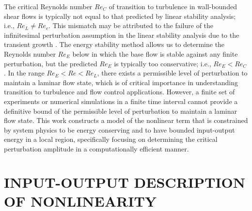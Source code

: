 \documentclass[10pt, a4paper]{article}
\begin{document}
The critical Reynolds number $Re_C$ of transition to turbulence in wall-bounded shear flows is typically not equal to that predicted by linear stability analysis; i.e., $Re_L\neq Re_c$. This mismatch may be attributed to the failure of the infinitesimal perturbation assumption in the linear stability analysis due to the transient growth \citep{henningson1994role}. The energy stability method \citep{joseph2013stability} allows us to determine the Reynolds number $Re_E$ below in which the base flow is stable against any finite perturbation, but the predicted $Re_E$ is typically too conservative; i.e., $Re_E<Re_C$. In the range $Re_E<Re<Re_L$, there exists a permissible level of perturbation to maintain a laminar flow state, which is of critical importance in understanding transition to turbulence and flow control applications. However, a finite set of experiments or numerical simulations in a finite time interval cannot provide a definitive bound of the permissible level of perturbation to maintain a laminar flow state. This work constructs a model of the nonlinear term that is constrained by system physics to be energy conserving and to have bounded input-output energy in a local region, specifically focusing on determining the critical perturbation amplitude in a computationally efficient manner. 



\vspace{-2mm}

\section{INPUT-OUTPUT DESCRIPTION OF NONLINEARITY}
\vspace{-2mm}
\end{document}
